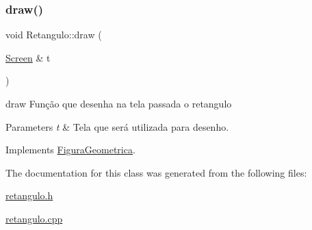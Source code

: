 \subsubsection{\texorpdfstring{draw()}{draw()}}
{\footnotesize\ttfamily void Retangulo\+::draw (\begin{DoxyParamCaption}\item[{\mbox{\hyperlink{class_screen}{Screen}} \&}]{t }\end{DoxyParamCaption})\hspace{0.3cm}{\ttfamily [virtual]}}



draw Função que desenha na tela passada o retangulo 


\begin{DoxyParams}{Parameters}
{\em t} & Tela que será utilizada para desenho. \\
\hline
\end{DoxyParams}


Implements \mbox{\hyperlink{class_figura_geometrica_a8ee8dedc060b6059a805ea091aef2c41}{Figura\+Geometrica}}.



The documentation for this class was generated from the following files\+:\begin{DoxyCompactItemize}
\item 
\mbox{\hyperlink{retangulo_8h}{retangulo.\+h}}\item 
\mbox{\hyperlink{retangulo_8cpp}{retangulo.\+cpp}}\end{DoxyCompactItemize}
